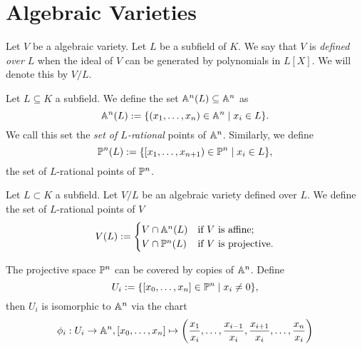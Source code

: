 \section{Algebraic Varieties}


\begin{definition}
	Let $V$ be a algebraic variety. Let $L$ be a subfield of $K$.
	We say that $V$ is \emph{defined over} $L$ when the ideal of
	$V$ can be generated by polynomials in $L[X]$.
	We will denote this by $V/L$.
\end{definition}

\begin{definition}
	Let $L \subseteq K$ a subfield.
	We define the set $\mathbb{A}^n(L) \subseteq \mathbb{A}^n$ as
	\begin{equation*}
		\mathbb{A}^n(L) := \{(x_1, \dots, x_n) \in \mathbb{A}^n \mid x_i \in L\}.
	\end{equation*}
	We call this set the \emph{set of $L$-rational} points of $\mathbb{A}^n$.
	Similarly, we define
	\begin{equation*}
		\mathbb{P}^n(L) := \{[x_1, \dots, x_{n+1}) \in \mathbb{P}^n \mid x_i \in L\},
	\end{equation*}
	the set of $L$-rational points of $\mathbb{P}^n$.
\end{definition}

\begin{definition}
	Let $L \subset K$ a subfield.
	Let $V/L$ be an algebraic variety defined over $L$.
 	We define the set
	of $L$-rational points of $V$
	\begin{equation*}
		V(L) := 
		\begin{cases}
			V\cap\mathbb{A}^n(L) &\textrm{if $V$ is affine;}\\
			V\cap\mathbb{P}^n(L) &\textrm{if $V$ is projective.}
		\end{cases}
	\end{equation*}
\end{definition}

The projective space $\mathbb{P}^n$ can be covered by copies of $\mathbb{A}^n$. Define
\begin{equation*}
	U_i := \{[x_0, \dots, x_n] \in \mathbb{P}^n \mid x_i \neq 0\},
\end{equation*}
then $U_i$ is isomorphic to $\mathbb{A}^n$ via the chart
\begin{equation*}
	\phi_i: U_i \to \mathbb{A}^n, [x_0, \dots, x_n] \mapsto \left(\frac{x_1}{x_i}, \dots,
		\frac{x_{i-1}}{x_i}, \frac{x_{i+1}}{x_i}, \dots, 
		\frac{x_n}{x_i}\right)
\end{equation*}

